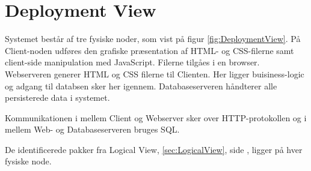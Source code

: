 \section{Deployment View}
Systemet består af tre fysiske noder, som vist på figur \ref{fig:DeploymentView}. På Client-noden udføres den grafiske præsentation af HTML- og CSS-filerne samt client-side manipulation med JavaScript. Filerne tilgåes i en browser.
Webserveren generer HTML og CSS filerne til Clienten. Her ligger buisiness-logic og adgang til databsen sker her igennem.
Databaseserveren håndterer alle persisterede data i systemet.

Kommunikationen i mellem Client og Webserver sker over HTTP-protokollen og i mellem Web- og Databaseserveren bruges SQL.


De identificerede pakker fra Logical View, \ref{sec:LogicalView}, side \pageref{sec:LogicalView}, ligger på hver fysiske node.